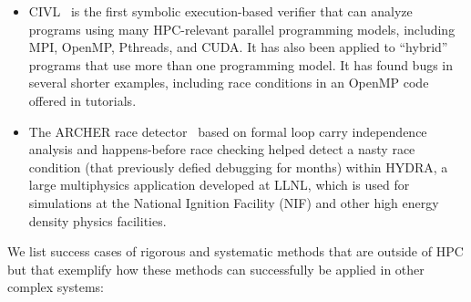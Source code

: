 \begin{itemize}
\item CIVL~\cite{CIVL} is the first symbolic execution-based verifier 
that can analyze programs using many HPC-relevant parallel programming models, 
including MPI, OpenMP, Pthreads, and CUDA. It has also been applied to 
``hybrid'' programs that use more than one programming model. It has found 
bugs in several shorter examples, including race conditions in an OpenMP 
code offered in tutorials.

\item The ARCHER race detector~\cite{ARCHER} based on formal loop carry independence 
analysis and happens-before race checking helped detect a nasty race condition 
(that previously defied debugging for months)  within HYDRA, a large multiphysics 
application developed at LLNL, which is used for simulations at the National 
Ignition Facility (NIF) and other high energy density physics facilities.


\end{itemize}

We list success cases of rigorous and systematic methods that are outside of HPC
but that exemplify how these methods can successfully be applied in other complex
systems:

